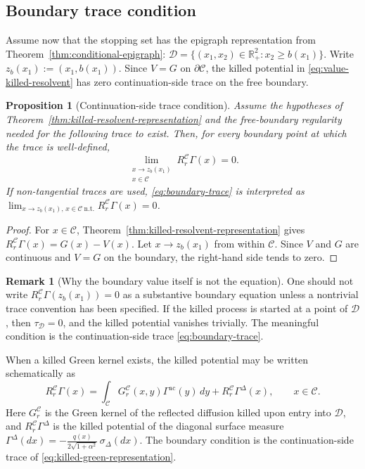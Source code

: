 \documentclass[pdflatex,sn-mathphys-num]{sn-jnl}
\theoremstyle{plain}
\newtheorem{proposition}[theorem]{Proposition}
\theoremstyle{definition}
\newtheorem{remark}[theorem]{Remark}
\newcommand{\R}{\mathbb{R}}
\begin{document}
\subsection{Boundary trace condition}
\label{sec:boundary-trace-condition}
Assume now that the stopping set has the epigraph representation from
Theorem~\ref{thm:conditional-epigraph}:
$\mathcal D=\{(x_1,x_2)\in\R^2_+:x_2\ge b(x_1)\}$. Write
$\displaystyle    z_b(x_1):=(x_1,b(x_1))$.
Since $V=G$ on $\partial\mathcal C$, the killed potential in
\eqref{eq:value-killed-resolvent} has zero continuation-side trace on the free
boundary.

\begin{proposition}[Continuation-side trace condition]
\label{prop:boundary-trace}
Assume the hypotheses of Theorem~\ref{thm:killed-resolvent-representation} and
the free-boundary regularity needed for the following trace to exist. Then, for
every boundary point at which the trace is well-defined,
\begin{equation}
\label{eq:boundary-trace}
   \lim_{\substack{x\to z_b(x_1)\\ x\in\mathcal C}}
   R_r^{\mathcal C}\Gamma(x)
   =0.
\end{equation}
If non-tangential traces are used, \eqref{eq:boundary-trace} is interpreted as
$\lim_{x\to z_b(x_1),\,x\in\mathcal C\ \mathrm{n.t.}}R_r^{\mathcal C}\Gamma(x)=0$.
\end{proposition}
\begin{proof}
For $x\in\mathcal C$, Theorem~\ref{thm:killed-resolvent-representation} gives
$R_r^{\mathcal C}\Gamma(x)=G(x)-V(x)$. Let $x\to z_b(x_1)$ from within
$\mathcal C$. Since $V$ and $G$ are continuous and $V=G$ on the boundary, the
right-hand side tends to zero.
\end{proof}

\begin{remark}[Why the boundary value itself is not the equation]
\label{rem:boundary-value-trivial}
One should not write $R_r^{\mathcal C}\Gamma(z_b(x_1))=0$ as a substantive
boundary equation unless a nontrivial trace convention has been specified. If
the killed process is started at a point of $\mathcal D$, then
$\tau_{\mathcal D}=0$, and the killed potential vanishes trivially. The
meaningful condition is the continuation-side trace \eqref{eq:boundary-trace}.
\end{remark}

When a killed Green kernel exists, the killed potential may be written
schematically as
\begin{equation}
\label{eq:killed-green-representation}
   R_r^{\mathcal C}\Gamma(x)
   =
   \int_{\mathcal C}G_r^{\mathcal C}(x,y)
      \Gamma^{\mathrm{ac}}(y)\,dy
   +R_r^{\mathcal C}\Gamma^\Delta(x),
   \qquad x\in\mathcal C.
\end{equation}
Here $G_r^{\mathcal C}$ is the Green kernel of the reflected diffusion killed
upon entry into $\mathcal D$, and $R_r^{\mathcal C}\Gamma^\Delta$ is the killed
potential of the diagonal surface measure
$\Gamma^\Delta(dx)=-\frac{q(x)}{2\sqrt{1+\alpha^2}}\,\sigma_\Delta(dx)$. The
boundary condition is the continuation-side trace of
\eqref{eq:killed-green-representation}.
\end{document}

